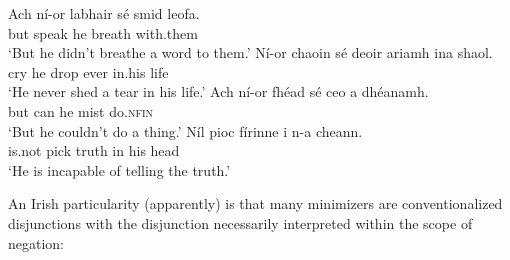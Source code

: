 \documentclass[output=paper,colorlinks,citecolor=brown]{langscibook}
\begin{document}
\ea
\ea
\gll Ach ní-or labhair sé smid leofa. \\
     but {\nior} {speak\past} he breath with.them \\
\glt `But he didn't breathe a word to them.'
\ex
\gll Ní-or chaoin sé deoir ariamh ina shaol. \\
     {\nior} {cry\past} he drop ever in.his life \\
\glt `He never shed a tear in his life.'
\ex
\gll Ach ní-or fhéad sé ceo {a dhéanamh.} \\
     but {\nior} {can\past} he mist {do.\textsc{nfin}} \\
\glt `But he couldn't do a thing.'
\ex
\gll Níl pioc fírinne i {n-a} cheann. \\
     {is.not} pick {truth\gen} in his head \\
\glt `He is incapable of telling the truth.'
\z
\z


An Irish particularity (apparently) is that many minimizers are conventionalized disjunctions with the disjunction necessarily interpreted within the scope of negation:
\end{document}

